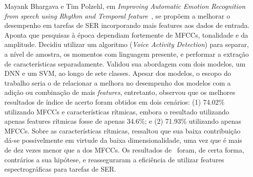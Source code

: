 Mayank Bhargava e Tim Polzehl, em \textit{Improving Automatic Emotion Recognition from speech using Rhythm and Temporal feature}~\cite{11}, se propõem a melhorar o desempenho em tarefas de \acrshort{SER} incorporando mais features aos dados de entrada. Aponta que pesquisas à época dependiam fortemente de \acrshort{MFCC}s, tonalidade e da amplitude. Decidiu utilizar um algoritmo (\textit{Voice Activity Detection}) para separar, a nível de amostra, os momentos com linguagem presente, e performar a extração de características separadamente. Validou sua abordagem com dois modelos, um \acrshort{DNN} e um \acrshort{SVM}, ao longo de sete classes. Apesar dos modelos, o escopo do trabalho seria o de relacionar a melhora no desempenho dos modelos com a adição ou combinação de mais \textit{features}, entretanto, observou que os melhores resultados de índice de acerto foram obtidos em dois cenários: (1) 74.02\% utilizando \acrshort{MFCC}s e características rítmicas, embora o resultado utilizando apenas features rítmicas fosse de apenas 34.6\%; e (2) 71.93\% utilizando apenas \acrshort{MFCC}s. Sobre as características rítmicas, ressaltou que sua baixa contribuição dá-se possivelmente em virtude da baixa dimensionalidade, uma vez que é mais de dez vezes menor que a dos \acrshort{MFCC}s. Os resultados de~\cite{11} foram, de certa forma, contrários a sua hipótese, e reasseguraram a eficiência de utilizar features espectrográficas para tarefas de \acrshort{SER}.

